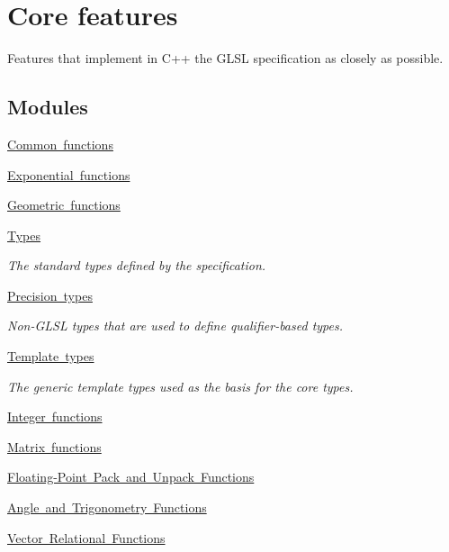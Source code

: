 \hypertarget{group__core}{}\section{Core features}
\label{group__core}


Features that implement in C++ the G\+L\+SL specification as closely as possible.  


\subsection*{Modules}
\begin{DoxyCompactItemize}
\item 
\mbox{\hyperlink{group__core__func__common}{Common functions}}
\item 
\mbox{\hyperlink{group__core__func__exponential}{Exponential functions}}
\item 
\mbox{\hyperlink{group__core__func__geometric}{Geometric functions}}
\item 
\mbox{\hyperlink{group__core__types}{Types}}
\begin{DoxyCompactList}\small\item\em The standard types defined by the specification. \end{DoxyCompactList}\item 
\mbox{\hyperlink{group__core__precision}{Precision types}}
\begin{DoxyCompactList}\small\item\em Non-\/\+G\+L\+SL types that are used to define qualifier-\/based types. \end{DoxyCompactList}\item 
\mbox{\hyperlink{group__core__template}{Template types}}
\begin{DoxyCompactList}\small\item\em The generic template types used as the basis for the core types. \end{DoxyCompactList}\item 
\mbox{\hyperlink{group__core__func__integer}{Integer functions}}
\item 
\mbox{\hyperlink{group__core__func__matrix}{Matrix functions}}
\item 
\mbox{\hyperlink{group__core__func__packing}{Floating-\/\+Point Pack and Unpack Functions}}
\item 
\mbox{\hyperlink{group__core__func__trigonometric}{Angle and Trigonometry Functions}}
\item 
\mbox{\hyperlink{group__core__func__vector__relational}{Vector Relational Functions}}
\end{DoxyCompactItemize}


